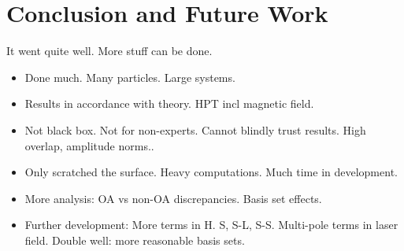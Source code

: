 \chapter{Conclusion and Future Work}

It went quite well. More stuff can be done.

\begin{itemize}
    \item Done much. Many particles. Large systems.
    \item Results in accordance with theory. HPT incl magnetic field.
    \item Not black box. Not for non-experts. Cannot blindly trust results.
        High overlap, amplitude norms..
    \item Only scratched the surface. Heavy computations. Much time in development.
    \item More analysis: OA vs non-OA discrepancies. Basis set effects.
    \item Further development: More terms in H. S, S-L, S-S. 
        Multi-pole terms in laser field. Double well: more reasonable basis sets.
\end{itemize}
